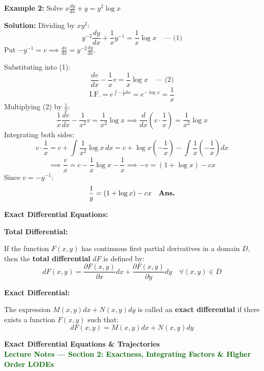 \documentclass[11pt,a4paper]{article}
\newcommand{\Heading}[1]{\vspace{0.3cm}\noindent\textbf{\textcolor{AcademicGreen}{\large #1}}\par\vspace{0.15cm}}
\begin{document}
\begin{tcolorbox}[greenbox]
    \textbf{\textcolor{AcademicGreen}{Example 2:}} Solve $x\frac{dy}{dx} + y = y^2 \log x$
    
    \vspace{0.15cm}
    \noindent\textbf{Solution:} Dividing by $x y^2$:
    \[
    y^{-2}\frac{dy}{dx} + \frac{1}{x}y^{-1} = \frac{1}{x}\log x \quad \text{--- (1)}
    \]
    Put $-y^{-1} = v \implies \frac{dv}{dx} = y^{-2}\frac{dy}{dx}$.
    
    \noindent Substituting into (1):
    \[
    \frac{dv}{dx} - \frac{1}{x}v = \frac{1}{x}\log x \quad \text{--- (2)}
    \]
    \[
    \text{I.F.} = e^{\int -\frac{1}{x} dx} = e^{-\log x} = \frac{1}{x}
    \]
    Multiplying (2) by $\frac{1}{x}$:
    \[
    \frac{1}{x}\frac{dv}{dx} - \frac{1}{x^2}v = \frac{1}{x^2}\log x \implies \frac{d}{dx}\left(v \cdot \frac{1}{x}\right) = \frac{1}{x^2}\log x
    \]
    Integrating both sides:
    \[
    v \cdot \frac{1}{x} = c + \int \frac{1}{x^2}\log x \, dx = c + \log x \left(-\frac{1}{x}\right) - \int \frac{1}{x}\left(-\frac{1}{x}\right) dx
    \]
    \[
    \implies \frac{v}{x} = c - \frac{1}{x}\log x - \frac{1}{x} \implies -v = (1 + \log x) - cx
    \]
    Since $v = -y^{-1}$:
    \[
    \frac{1}{y} = (1 + \log x) - cx \quad \text{\textbf{Ans.}}
    \]
\end{tcolorbox}

\vspace{0.4cm}
\Heading{Exact Differential Equations:}

\Heading{Total Differential:}
If the function $F(x,y)$ has continuous first partial derivatives in a domain $D$, then the \textbf{total differential} $dF$ is defined by:
\[
dF(x,y) = \frac{\partial F(x,y)}{\partial x}dx + \frac{\partial F(x,y)}{\partial y}dy \quad \forall (x,y) \in D
\]

\Heading{Exact Differential:}
The expression $M(x,y)dx + N(x,y)dy$ is called an \textbf{exact differential} if there exists a function $F(x,y)$ such that:
\[
dF(x,y) = M(x,y)dx + N(x,y)dy
\]

\newpage

\begin{center}
    {\LARGE\bfseries\textcolor{AcademicGreen}{Exact Differential Equations \& Trajectories}} \\[0.2cm]
    {\small\textcolor{DarkGreen}{\textbf{Lecture Notes --- Section 2: Exactness, Integrating Factors \& Higher Order LODEs}}}
    \vspace{0.3cm}
\end{center}
\end{document}
